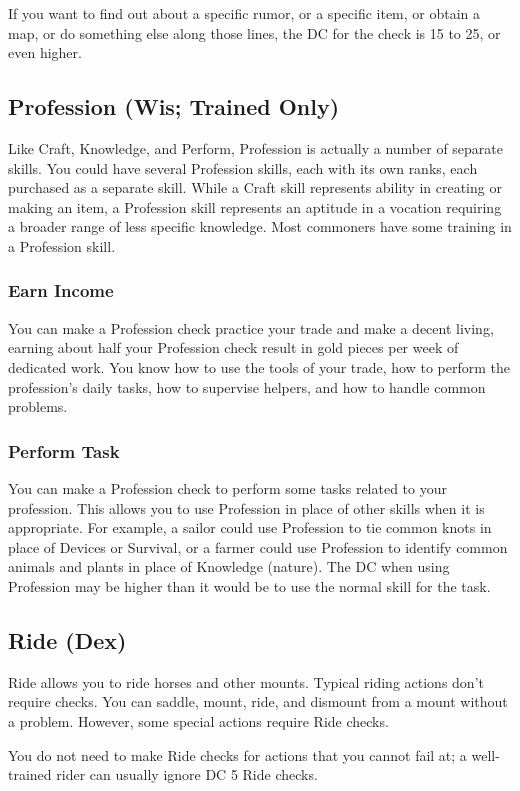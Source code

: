 If you want to find out about a specific rumor, or a specific item, or obtain a map, or do something else along those lines, the DC for the check is 15 to 25, or even higher.

\subsection{Profession (Wis; Trained Only)}
Like Craft, Knowledge, and Perform, Profession is actually a number of separate skills. You could have several Profession skills, each with its own ranks, each purchased as a separate skill. While a Craft skill represents ability in creating or making an item, a Profession skill represents an aptitude in a vocation requiring a broader range of less specific knowledge. Most commoners have some training in a Profession skill. 

\subsubsection{Earn Income}
You can make a Profession check practice your trade and make a decent living, earning about half your Profession check result in gold pieces per week of dedicated work. You know how to use the tools of your trade, how to perform the profession's daily tasks, how to supervise helpers, and how to handle common problems.

\subsubsection{Perform Task}
You can make a Profession check to perform some tasks related to your profession. This allows you to use Profession in place of other skills when it is appropriate. For example, a sailor could use Profession to tie common knots in place of Devices or Survival, or a farmer could use Profession to identify common animals and plants in place of Knowledge (nature). The DC when using Profession may be higher than it would be to use the normal skill for the task.

\subsection{Ride (Dex)}
Ride allows you to ride horses and other mounts. Typical riding actions don't require checks. You can saddle, mount, ride, and dismount from a mount without a problem. However, some special actions require Ride checks. 

You do not need to make Ride checks for actions that you cannot fail at; a well-trained rider can usually ignore DC 5 Ride checks.

